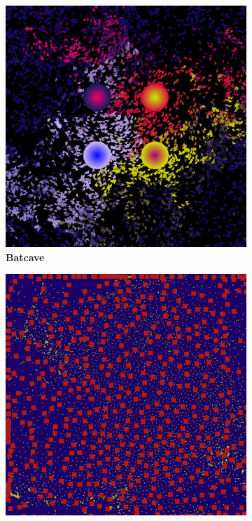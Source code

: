 \documentclass[../mciAusarbeitung.tex]{subfiles}
\begin{document}
	\begin{figure}[H]
		\begin{subfigure}{0.5\linewidth}
			\includegraphics[width=0.95\linewidth]{"img/swarm_batcave.jpg"}
			\caption[Batcave]{\textbf{Batcave}}  
		\end{subfigure}	
		\begin{subfigure}{0.5\linewidth}
			\includegraphics[width=0.95\linewidth]{"img/swarm_2x.jpg"}

\end{subfigure}
\end{figure}
\end{document}
